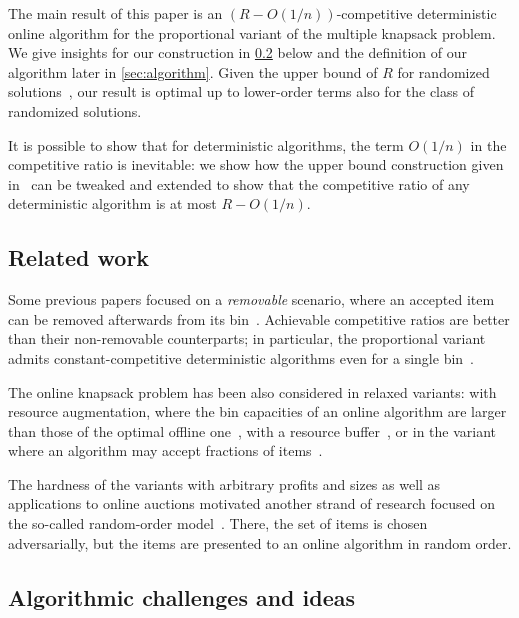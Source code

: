 \documentclass[a4paper,USenglish,cleveref]{lipics-v2019}
\newcommand{\R}{\ensuremath{R}}
\newcommand\maciek[1]{\texthl{#1}}
\begin{document}
The main result of this paper is an $(\R-O(1/n))$-competitive deterministic
online algorithm for the proportional variant of the multiple knapsack problem.
We give insights for our construction in \cref{sec:idea} below and the
definition of our algorithm later in \cref{sec:algorithm}. Given the upper bound
of $\R$ for randomized solutions~\cite{CyJeSg16}, our result is optimal up to
lower-order terms also for the class of randomized solutions.

It is possible to show that for deterministic algorithms, 
the term $O(1/n)$ in the competitive 
ratio is inevitable: \maciek{in Section~\ref{sec:upper}} we show how the upper bound
construction given in~\cite{CyJeSg16} can be tweaked and extended to show that the
competitive ratio of any deterministic algorithm is at most $\R-O(1/n)$.



\subsection{Related work}

Some previous papers focused on a \emph{removable} scenario, where an accepted item can
be removed afterwards from its
bin~\cite{ABFLNE02,CyJeSg16,HaKaMa15,IwaTak02,IwaZha10}. Achievable competitive
ratios are better than their non-removable counterparts; in particular, the
proportional variant admits constant-competitive deterministic algorithms even
for a single bin~\cite{IwaTak02}.

The online knapsack problem has been also considered in relaxed variants: with
resource augmentation, where the bin capacities of an online algorithm are
larger than those of the optimal offline one~\cite{IwaZha10,NogSar05}, with a
resource buffer~\cite{HaKaMY19}, or in the variant where an algorithm may accept
fractions of items~\cite{NogSar05}.

The hardness of the variants with arbitrary profits and sizes as well as
applications to online auctions motivated another strand of research focused on
the so-called random-order model~\cite{AlKhLa19,BaImKK07,KeRaTV18,Vaze17}.
There, the set of items is chosen adversarially, but the items are presented to an
online algorithm in random order. 



\subsection{Algorithmic challenges and ideas}
\label{sec:idea}
\end{document}
